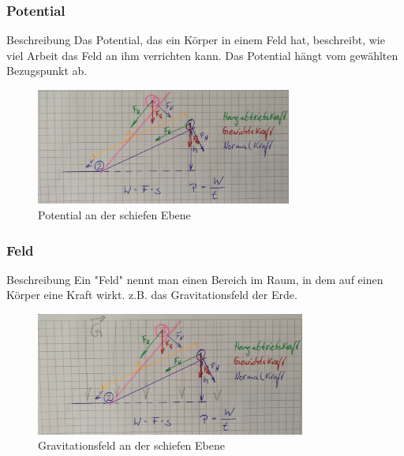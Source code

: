 \documentclass{article}
\begin{document}
\frame
{
  \frametitle{Potential}
\begin{block}{Beschreibung}
Das Potential, das ein Körper in einem Feld hat, beschreibt, wie viel Arbeit das Feld an ihm verrichten kann. Das Potential hängt vom gewählten Bezugspunkt ab.
\end{block}
      \begin{figure}
	  \includegraphics[width=0.75\textwidth]{Leistung}
	  \vspace{-3mm}
	  \caption{Potential an der schiefen Ebene}
   \end{figure}
}

\frame
{
  \frametitle{Feld}
\begin{block}{Beschreibung}
Ein "Feld" nennt man einen Bereich im Raum, in dem auf einen Körper eine Kraft wirkt. z.B. das Gravitationsfeld der Erde.
\end{block}
      \begin{figure}
	  \includegraphics[width=0.79\textwidth]{Feld}
	  \vspace{-3mm}
	  \caption{Gravitationsfeld an der schiefen Ebene}
   \end{figure}
}
\end{document}
